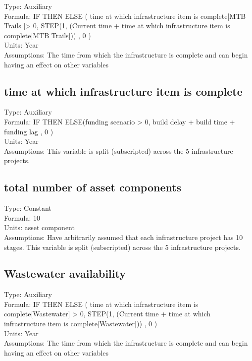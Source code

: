 \documentclass[
  11pt,
]{book}
\begin{document}
Type: Auxiliary\\
Formula: IF THEN ELSE ( time at which infrastructure item is complete{[}MTB Trails {]}\textgreater{} 0, STEP(1, (Current time + time at which infrastructure item is complete{[}MTB Trails{]})) , 0 )\\
Units: Year\\
Assumptions: The time from which the infrastructure is complete and can begin having an effect on other variables

\hypertarget{time-at-which-infrastructure-item-is-complete}{%
\subsection{time at which infrastructure item is complete}\label{time-at-which-infrastructure-item-is-complete}}

Type: Auxiliary\\
Formula: IF THEN ELSE(funding scenario \textgreater{} 0, build delay + build time + funding lag , 0 )\\
Units: Year\\
Assumptions: This variable is split (subscripted) across the 5 infrastructure projects.

\hypertarget{total-number-of-asset-components}{%
\subsection{total number of asset components}\label{total-number-of-asset-components}}

Type: Constant\\
Formula: 10\\
Units: asset component\\
Assumptions: Have arbitrarily assumed that each infrastructure project has 10 stages. This variable is split (subscripted) across the 5 infrastructure projects.

\hypertarget{wastewater-availability}{%
\subsection{Wastewater availability}\label{wastewater-availability}}

Type: Auxiliary\\
Formula: IF THEN ELSE ( time at which infrastructure item is complete{[}Wastewater{]} \textgreater{} 0, STEP(1, (Current time + time at which infrastructure item is complete{[}Wastewater{]})) , 0 )\\
Units: Year\\
Assumptions: The time from which the infrastructure is complete and can begin having an effect on other variables
\end{document}
